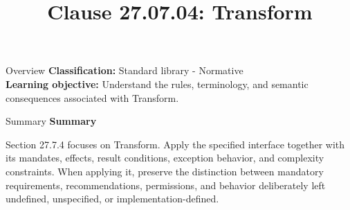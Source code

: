 \documentclass[10pt,letterpaper]{article}
\title{Clause 27.07.04: Transform}
\author{}
\date{}
\begin{document}
\maketitle
\begin{CornellOverviewBox}{Overview}
\textbf{Classification:} Standard library - Normative\\[2pt]
\textbf{Learning objective:} Understand the rules, terminology, and semantic consequences associated with Transform.
\end{CornellOverviewBox}\begin{CornellSummaryBox}{Summary}
{\sffamily\bfseries\color{Accent} Summary}\par\vspace{3pt}Section 27.7.4 focuses on Transform. Apply the specified interface together with its mandates, effects, result conditions, exception behavior, and complexity constraints. When applying it, preserve the distinction between mandatory requirements, recommendations, permissions, and behavior deliberately left undefined, unspecified, or implementation-defined.
\end{CornellSummaryBox}
\end{document}
